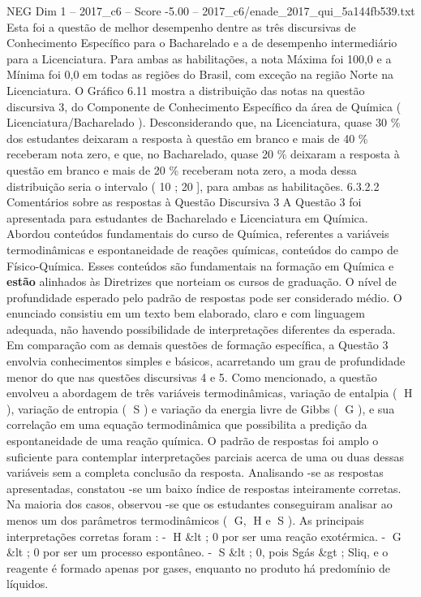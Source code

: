\begin{textsample}{NEG Dim 1 – 2017\_c6 – Score -5.00 – 2017\_c6/enade\_2017\_qui\_5a144fb539.txt}
Esta foi a questão de melhor desempenho dentre as três discursivas de Conhecimento Específico para o Bacharelado e a de desempenho intermediário para a Licenciatura.
Para ambas as habilitações, a nota Máxima foi 100,0 e a Mínima foi 0,0 em todas as regiões do Brasil, com exceção na região Norte na Licenciatura.
O Gráfico 6.11 mostra a distribuição das notas na questão discursiva 3, do Componente de Conhecimento Específico da área de Química ( Licenciatura/Bacharelado ).
Desconsiderando que, na Licenciatura, quase 30 \% dos estudantes deixaram a resposta à questão em branco e mais de 40 \% receberam nota zero, e que, no Bacharelado, quase 20 \% deixaram a resposta à questão em branco e mais de 20 \% receberam nota zero, a moda dessa distribuição seria o intervalo ( 10 ; 20 ], para ambas as habilitações. 6.3.2.2 Comentários sobre as respostas à Questão Discursiva 3 A Questão 3 foi apresentada para estudantes de Bacharelado e Licenciatura em Química.
Abordou conteúdos fundamentais do curso de Química, referentes a variáveis termodinâmicas e espontaneidade de reações químicas, conteúdos do campo de Físico-Química.
Esses conteúdos são fundamentais na formação em Química e \textbf{estão} alinhados às Diretrizes que norteiam os cursos de graduação.
O nível de profundidade esperado pelo padrão de respostas pode ser considerado médio.
O enunciado consistiu em um texto bem elaborado, claro e com linguagem adequada, não havendo possibilidade de interpretações diferentes da esperada.
Em comparação com as demais questões de formação específica, a Questão 3 envolvia conhecimentos simples e básicos, acarretando um grau de profundidade menor do que nas questões discursivas 4 e 5.
Como mencionado, a questão envolveu a abordagem de três variáveis termodinâmicas, variação de entalpia ( H ), variação de entropia ( S ) e variação da energia livre de Gibbs ( G ), e sua correlação em uma equação termodinâmica que possibilita a predição da espontaneidade de uma reação química.
O padrão de respostas foi amplo o suficiente para contemplar interpretações parciais acerca de uma ou duas dessas variáveis sem a completa conclusão da resposta.
Analisando -se as respostas apresentadas, constatou -se um baixo índice de respostas inteiramente corretas.
Na maioria dos casos, observou -se que os estudantes conseguiram analisar ao menos um dos parâmetros termodinâmicos ( G, H e S ).
As principais interpretações corretas foram : - H \&lt ; 0 por ser uma reação exotérmica. - G \&lt ; 0 por ser um processo espontâneo. - S \&lt ; 0, pois Sgás \&gt ; Sliq, e o reagente é formado apenas por gases, enquanto no produto há predomínio de líquidos.

\end{textsample}
